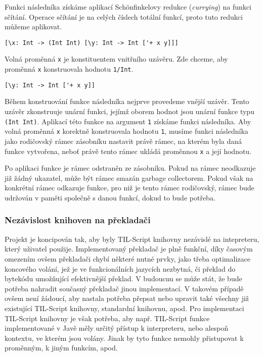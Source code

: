 Funkci následníka získáme aplikací Sch{\"o}nfinkelovy redukce (\textit{currying}) na funkci sčítání.
Operace sčítání je na celých číslech totální funkcí, proto tuto redukci můžeme aplikovat.

\begin{lstlisting}[caption={Vnější uzávěr}]
[\x: Int -> (Int Int) [\y: Int -> Int ['+ x y]]]
\end{lstlisting}

Volná proměnná \lstinline{x} je konstituentem vnitřního uzávěru. Zde chceme, aby proměnná
\lstinline{x} konstruovala hodnotu \lstinline{1/Int}.

\begin{lstlisting}[caption={Vnitřní uzávěr}]
[\y: Int -> Int ['+ x y]]
\end{lstlisting}

Během konstruování funkce následníka nejprve provedeme vnější uzávěr. Tento uzávěr zkonstruuje
unární funkci, jejímž oborem hodnot jsou unární funkce typu \lstinline{(Int Int)}. Aplikací této
funkce na argument \lstinline{1} získáme funkci následníka. Aby volná proměnná \lstinline{x}
korektně konstruovala hodnotu \lstinline{1}, musíme funkci následníka jako rodičovský rámec
zásobníku nastavit právě rámec, na kterém byla daná funkce vytvořena, neboť právě tento rámec
ukládá proměnnou \lstinline{x} a její hodnotu.

Po aplikaci funkce je rámec odstraněn ze zásobníku. Pokud na rámec neodkazuje již žádný ukazatel,
může být rámec smazán garbage collectorem. Pokud však na konkrétní rámec odkazuje funkce, pro niž
je tento rámec rodičovský, rámec bude udržován v paměti společně s danou funkcí, dokud to bude
potřeba.

\subsubsection{Nezávislost knihoven na překladači}

Projekt je koncipován tak, aby byly TIL-Script knihovny nezávislé na intepreteru, který uživatel
použije. Implementovaný překladač je plně funkční, díky časovým omezením ovšem překladači chybí
některé nutné prvky, jako třeba optimalizace koncového volání, jež je ve funkcionálních
jazycích nezbytná, či překlad do bytekódu umožňující efektivnější překlad. V budoucnu se může stát,
že bude potřeba nahradit současný překladač jinou implementací. V takovém případě ovšem není
žádoucí, aby nastala potřeba přepsat nebo upravit také všechny již existující TIL-Script knihovny,
standardní knihovnu, apod. Pro implementaci TIL-Script knihovny je však potřeba, aby např.
TIL-Script funkce implementované v Javě měly určitý přístup k interpreteru, nebo alespoň kontextu,
ve kterém jsou volány. Jinak by tyto funkce nemohly přistupovat k proměnným, k jiným funkcím, apod.

